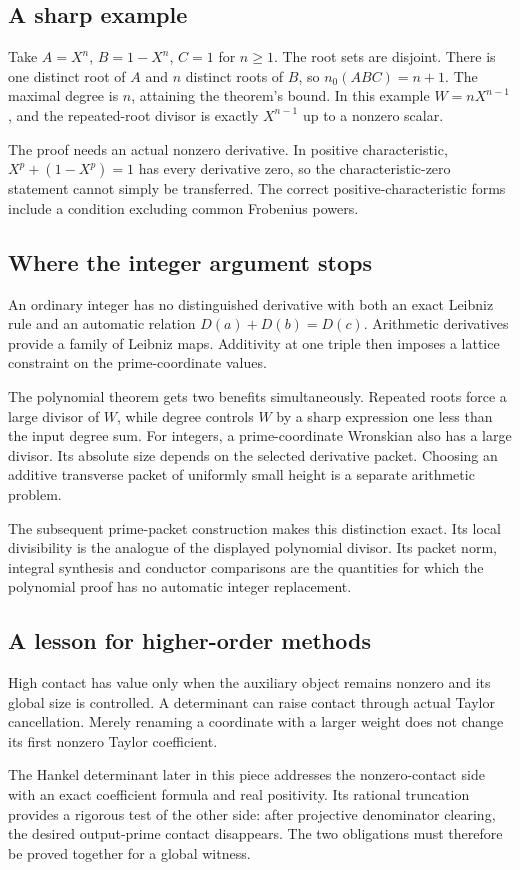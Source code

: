 \subsection{A sharp example}
Take $A=X^n$, $B=1-X^n$, $C=1$ for $n\ge1$. The root sets are disjoint. There is one distinct root of $A$ and $n$ distinct roots of $B$, so $n_0(ABC)=n+1$. The maximal degree is $n$, attaining the theorem's bound. In this example $W=nX^{n-1}$, and the repeated-root divisor is exactly $X^{n-1}$ up to a nonzero scalar.

The proof needs an actual nonzero derivative. In positive characteristic, $X^p+(1-X^p)=1$ has every derivative zero, so the characteristic-zero statement cannot simply be transferred. The correct positive-characteristic forms include a condition excluding common Frobenius powers.

\subsection{Where the integer argument stops}
An ordinary integer has no distinguished derivative with both an exact Leibniz rule and an automatic relation $D(a)+D(b)=D(c)$. Arithmetic derivatives provide a family of Leibniz maps. Additivity at one triple then imposes a lattice constraint on the prime-coordinate values.

The polynomial theorem gets two benefits simultaneously. Repeated roots force a large divisor of $W$, while degree controls $W$ by a sharp expression one less than the input degree sum. For integers, a prime-coordinate Wronskian also has a large divisor. Its absolute size depends on the selected derivative packet. Choosing an additive transverse packet of uniformly small height is a separate arithmetic problem.

The subsequent prime-packet construction makes this distinction exact. Its local divisibility is the analogue of the displayed polynomial divisor. Its packet norm, integral synthesis and conductor comparisons are the quantities for which the polynomial proof has no automatic integer replacement.

\subsection{A lesson for higher-order methods}
High contact has value only when the auxiliary object remains nonzero and its global size is controlled. A determinant can raise contact through actual Taylor cancellation. Merely renaming a coordinate with a larger weight does not change its first nonzero Taylor coefficient.

The Hankel determinant later in this piece addresses the nonzero-contact side with an exact coefficient formula and real positivity. Its rational truncation provides a rigorous test of the other side: after projective denominator clearing, the desired output-prime contact disappears. The two obligations must therefore be proved together for a global witness.
